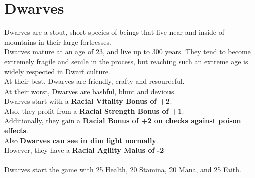 \section{Dwarves}\label{species:dwarves}
Dwarves are a stout, short species of beings that live near and inside of mountains in their large fortresses.\\
Dwarves mature at an age of 23, and live up to 300 years.
They tend to become extremely fragile and senile in the process, but reaching such an extreme age is widely respected in Dwarf culture.\\
At their best, Dwarves are friendly, crafty and resourceful.\\
At their worst, Dwarves are bashful, blunt and devious.\\
Dwarves start with a \textbf{Racial Vitality Bonus of +2}.\\
Also, they profit from a \textbf{Racial Strength Bonus of +1}.\\
Additionally, they gain a \textbf{Racial Bonus of +2 on checks against poison effects}.\\
Also \textbf{Dwarves can see in dim light normally}.\\
However, they have a \textbf{Racial Agility Malus of -2}\\\\
Dwarves start the game with 25 Health, 20 Stamina, 20 Mana, and 25 Faith.
